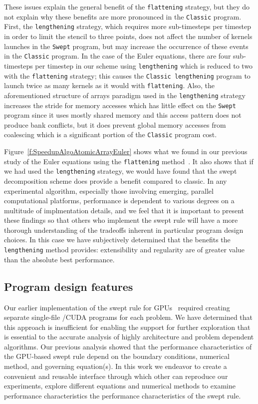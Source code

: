 These issues explain the general benefit of the \texttt{flattening} strategy, but they do not explain why these benefits are more pronounced in the \texttt{Classic} program.
First, the \texttt{lengthening} strategy, which requires more sub-timesteps per timestep in order to limit the stencil to three points, does not affect the number of kernels launches in the \texttt{Swept} program, but may increase the occurrence of these events in the \texttt{Classic} program.
In the case of the Euler equations, there are four sub-timesteps per timestep in our scheme using \texttt{lengthening} which is reduced to two with the \texttt{flattening} strategy; this causes the \texttt{Classic lengthening} program to launch twice as many kernels as it would with \texttt{flattening}. 
Also, the aforementioned structure of arrays paradigm used in the \texttt{lengthening} strategy increases the stride for memory accesses which has little effect on the \texttt{Swept} program since it uses mostly shared memory and this access pattern does not produce bank conflicts, but it does prevent global memory accesses from coalescing which is a significant portion of the \texttt{Classic} program cost.

Figure~\ref{f:SpeedupAlgoAtomicArrayEuler} shows what we found in our previous study of the Euler equations using the \texttt{flattening} method~\cite{OurJCP}.
It also shows that if we had used the \texttt{lengthening} strategy, we would have found that the swept decomposition scheme does provide a benefit compared to classic.
In any experimental algorithm, especially those involving emerging, parallel computational platforms, performance is dependent to various degrees on a multitude of implmentation details, and we feel that it is important to present these findings so that others who implement the swept rule will have a more thorough understanding of the tradeoffs inherent in particular program design choices.
In this case we have subjectively determined that the benefits the \texttt{lengthening} method provides: extensibility and regularity are of greater value than the absolute best performance.

\subsection{Program design features}

Our earlier implementation of the swept rule for GPUs~\cite{OurJCP} required creating separate single-file
\CC{}\slash CUDA programs for each problem.
We have determined that this approach is insufficient for enabling the support for further exploration that is essential to the accurate analysis of highly architecture
and problem dependent algorithms.
Our previous analysis showed that the performance characteristics of the GPU-based swept rule depend
on the boundary conditions, numerical method, and governing equation(s).
In this work we endeavor to create a convenient and reusable interface through which other can reproduce our experiments, explore different equations and numerical methods to examine performance characteristics the performance characteristics of the swept rule.

